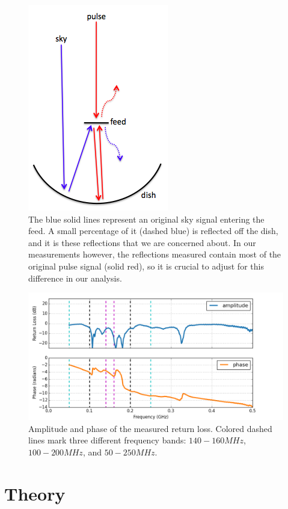 \documentclass[12pt,preprint]{aastex}
\begin{document}
\begin{figure}
\centering
\includegraphics[totalheight=0.3\textheight]{plots/reflection_cartoon.png}
\caption{The blue solid lines represent an original sky signal entering the feed. A small percentage of it (dashed blue) is reflected off the dish, and it is these reflections that we are concerned about. In our measurements however, the reflections measured contain most of the original pulse signal (solid red), so it is crucial to adjust for this difference in our analysis.}
\label{fig:cartoon}
\end{figure}

\begin{figure}
\centering
\includegraphics[totalheight=0.4\textheight]{plots/frequency_amp_phase_fullbw.png}
\caption{Amplitude and phase of the measured return loss. Colored dashed lines mark three different frequency bands: $140-160MHz$, $100-200MHz$, and $50-250MHz$.}
\label{fig:freq}
\end{figure}

\section{Theory}{\label{sec:theory}}
\end{document}
